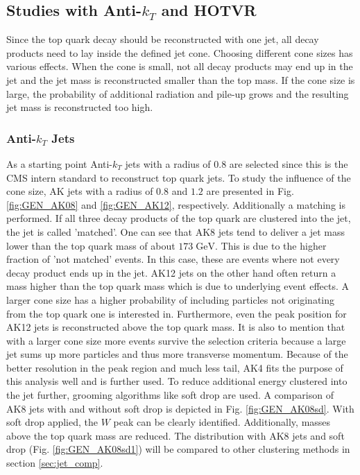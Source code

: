 \FloatBarrier %
\subsection{Studies with Anti-$k_T$ and HOTVR}
\label{sec:AKHOTVR}	
	Since the top quark decay should be reconstructed with one jet, all decay products need to lay inside the defined jet cone. Choosing different cone sizes has various effects. When the cone is small, not all decay products may end up in the jet and the jet mass is reconstructed smaller than the top mass. If the cone size is large, the probability of additional radiation and pile-up grows and the resulting jet mass is reconstructed too high. 
	\subsubsection{Anti-$k_T$ Jets}
	As a starting point Anti-$k_T$ jets with a radius of $0.8$ are selected since this is the CMS intern standard to reconstruct top quark jets. To study the influence of the cone size, AK jets with a radius of $0.8$ and $1.2$ are presented in Fig. \ref{fig:GEN_AK08} and \ref{fig:GEN_AK12}, respectively. Additionally a matching is performed. If all three decay products of the top quark are clustered into the jet, the jet is called 'matched'. One can see that AK8 jets tend to deliver a jet mass lower than the top quark mass of about $173\;\text{GeV}$. This is due to the higher fraction of 'not matched' events. In this case, these are events where not every decay product ends up in the jet. AK12 jets on the other hand often return a mass higher than the top quark mass which is due to underlying event effects. A larger cone size has a higher probability of including particles not originating from the top quark one is interested in. Furthermore, even the peak position for AK12 jets is reconstructed above the top quark mass. It is also to mention that with a larger cone size more events survive the selection criteria because a large jet sums up more particles and thus more transverse momentum. Because of the better resolution in the peak region and much less tail, AK4 fits the purpose of this analysis well and is further used. To reduce additional energy clustered into the jet further, grooming algorithms like soft drop are used. A comparison of AK8 jets with and without soft drop is depicted in Fig. \ref{fig:GEN_AK08sd}. With soft drop applied, the $W$ peak can be clearly identified. Additionally, masses above the top quark mass are reduced. The distribution with AK8 jets and soft drop (Fig. \ref{fig:GEN_AK08sd1}) will be compared to other clustering methods in section \ref{sec:jet_comp}.

